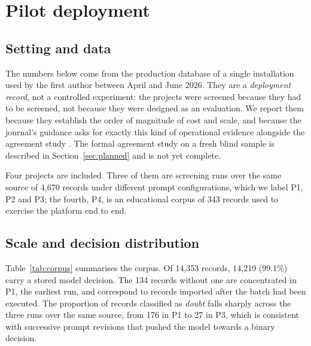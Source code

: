 \section{Pilot deployment}\label{sec:evaluation}

\subsection{Setting and data}

The numbers below come from the production database of a single installation
used by the first author between April and June 2026. They are a
\emph{deployment record}, not a controlled experiment: the projects were
screened because they had to be screened, not because they were designed as an
evaluation. We report them because they establish the order of magnitude of
cost and scale, and because the journal's guidance asks for exactly this kind
of operational evidence alongside the agreement study
\autocite{Farotimi_2025}. The formal agreement study on a fresh blind sample is
described in Section~\ref{sec:planned} and is not yet complete.

Four projects are included. Three of them are screening runs over the same
source of 4{,}670 records under different prompt configurations, which we
label P1, P2 and P3; the fourth, P4, is an educational corpus of 343 records
used to exercise the platform end to end.

\subsection{Scale and decision distribution}

Table~\ref{tab:corpus} summarises the corpus. Of 14{,}353 records, 14{,}219
(99.1\%) carry a stored model decision. The 134 records without one are
concentrated in P1, the earliest run, and correspond to records imported after
the batch had been executed. The proportion of records classified as
\emph{doubt} falls sharply across the three runs over the same source, from
176 in P1 to 27 in P3, which is consistent with successive prompt revisions
that pushed the model towards a binary decision.

